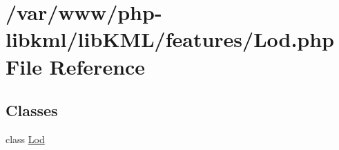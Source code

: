 \hypertarget{Lod_8php}{
\section{/var/www/php-\/libkml/libKML/features/Lod.php File Reference}
\label{df/dec/Lod_8php}
}
\subsection*{Classes}
\begin{DoxyCompactItemize}
\item 
class \hyperlink{classLod}{Lod}
\end{DoxyCompactItemize}

